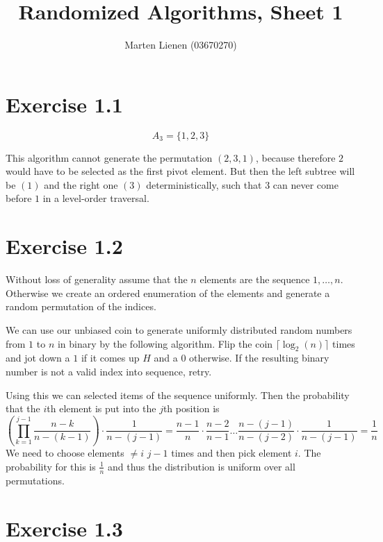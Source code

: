\documentclass[10pt,a4paper]{article}
\title{Randomized Algorithms, Sheet 1}
\author{Marten Lienen (03670270)}
\begin{document}
\maketitle

\section*{Exercise 1.1}

\begin{equation*}
  A_{3} = \{ 1, 2, 3 \}
\end{equation*}

This algorithm cannot generate the permutation $(2, 3, 1)$, because therefore $2$ would have to be selected as the first pivot element.
But then the left subtree will be $(1)$ and the right one $(3)$ deterministically, such that $3$ can never come before $1$ in a level-order traversal.

\section*{Exercise 1.2}

Without loss of generality assume that the $n$ elements are the sequence $1, \dots, n$.
Otherwise we create an ordered enumeration of the elements and generate a random permutation of the indices.

We can use our unbiased coin to generate uniformly distributed random numbers from $1$ to $n$ in binary by the following algorithm.
Flip the coin $\lceil \log_{2}(n) \rceil$ times and jot down a $1$ if it comes up $H$ and a $0$ otherwise.
If the resulting binary number is not a valid index into sequence, retry.

Using this we can selected items of the sequence uniformly.
Then the probability that the $i$th element is put into the $j$th position is
\begin{equation*}
  \left( \prod_{k = 1}^{j - 1} \frac{n - k}{n - (k - 1)} \right) \cdot \frac{1}{n - (j - 1)} = \frac{n - 1}{n} \cdot \frac{n - 2}{n - 1} \dots \frac{n - (j - 1)}{n - (j - 2)} \cdot \frac{1}{n - (j - 1)} = \frac{1}{n}
\end{equation*}
We need to choose elements $\ne i$ $j - 1$ times and then pick element $i$.
The probability for this is $\frac{1}{n}$ and thus the distribution is uniform over all permutations.

\section*{Exercise 1.3}
\end{document}
